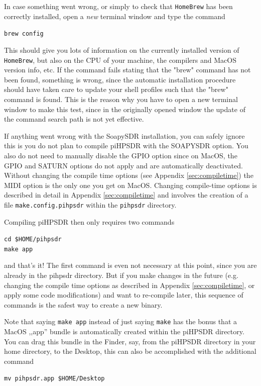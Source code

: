 \documentclass[12pt]{book}
\def\grtt#1{\texttt{\color{magenta}#1}}
\def\pH{pi\-HPSDR }
\begin{document}
 In case something went wrong, or simply to check that \texttt{HomeBrew} has been correctly installed,
 open a \textit{new} terminal window and type the command


\grtt{brew config}

 This should give you lots of information on the currently installed version of \texttt{HomeBrew},
 but also on the CPU of your machine, the compilers and MacOS version info, etc. If the command
 fails stating that the "brew" command has not been found, something is wrong, since the automatic
 installation procedure should have taken care to update your shell profiles such that the "brew"
 command is found. This is the reason why you have to open a new terminal window to make this test,
 since in the originally opened window the update of the command search path is not yet effective.

If anything went wrong with the SoapySDR installation, you can safely ignore this is
you do not plan to compile \pH with the SOAPYSDR option. You also do not need
to manually disable the GPIO option since on MacOS, the GPIO and SATURN options
do not apply and are automatically deactivated. Without changing the compile time
options (see Appendix \ref{sec:compiletime}) the MIDI option is the only one you get
on MacOS. Changing compile-time options is described in detail in Appendix \ref{sec:compiletime}
and involves the creation of a file \texttt{make.config.pihpsdr} within the \texttt{pihpsdr}
directory.

Compiling \pH then only requires two commands

\grtt{cd \$HOME/pihpsdr} \\
\grtt{make app}

and that's it! The first command is even not necessary at this point,
since you are already in the pihpsdr  directory.
But if you make changes in the future (e.g. changing the compile time options as described in
Appendix \ref{sec:compiletime}, or apply some code modifications)
and want to re-compile later, this sequence of commands is the safest way to create a new binary.

Note that saying \texttt{make app} instead of just saying \texttt{make} has the bonus
that a MacOS ,,app'' bundle is automatically created within the \pH directory.
You can drag this bundle in the Finder, say, from the \pH directory in your
home directory, to the Desktop, this can also be accomplished with the additional command

\grtt{mv pihpsdr.app \$HOME/Desktop}
\end{document}
